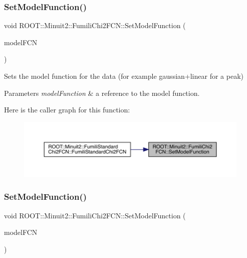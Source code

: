 \subsubsection{\texorpdfstring{SetModelFunction()}{SetModelFunction()}\hspace{0.1cm}{\footnotesize\ttfamily [1/2]}}
{\footnotesize\ttfamily void R\+O\+O\+T\+::\+Minuit2\+::\+Fumili\+Chi2\+F\+C\+N\+::\+Set\+Model\+Function (\begin{DoxyParamCaption}\item[{const \mbox{\hyperlink{classROOT_1_1Minuit2_1_1ParametricFunction}{Parametric\+Function}} \&}]{model\+F\+CN }\end{DoxyParamCaption})\hspace{0.3cm}{\ttfamily [inline]}}

Sets the model function for the data (for example gaussian+linear for a peak)


\begin{DoxyParams}{Parameters}
{\em model\+Function} & a reference to the model function. \\
\hline
\end{DoxyParams}
Here is the caller graph for this function\+:\nopagebreak
\begin{figure}[H]
\begin{center}
\leavevmode
\includegraphics[width=350pt]{d3/df0/classROOT_1_1Minuit2_1_1FumiliChi2FCN_a0db1c6dd4cbdc96107490f572cce20da_icgraph}
\end{center}
\end{figure}
\mbox{\label{classROOT_1_1Minuit2_1_1FumiliChi2FCN_a0db1c6dd4cbdc96107490f572cce20da}} 
\subsubsection{\texorpdfstring{SetModelFunction()}{SetModelFunction()}\hspace{0.1cm}{\footnotesize\ttfamily [2/2]}}
{\footnotesize\ttfamily void R\+O\+O\+T\+::\+Minuit2\+::\+Fumili\+Chi2\+F\+C\+N\+::\+Set\+Model\+Function (\begin{DoxyParamCaption}\item[{const \mbox{\hyperlink{classROOT_1_1Minuit2_1_1ParametricFunction}{Parametric\+Function}} \&}]{model\+F\+CN }\end{DoxyParamCaption})\hspace{0.3cm}{\ttfamily [inline]}}

